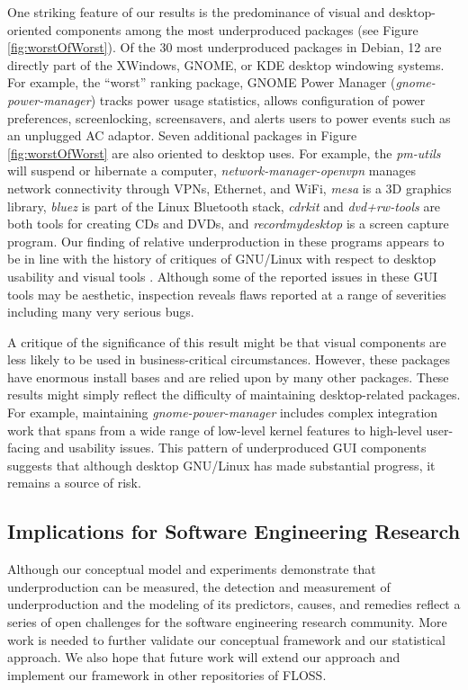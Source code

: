 \documentclass[10pt,conference]{IEEEtran}\usepackage[]{graphicx}\usepackage[usenames,dvipsnames]{color}
\begin{document}
One striking feature of our results is the predominance of visual and desktop-oriented components among the most underproduced packages (see Figure \ref{fig:worstOfWorst}). Of the 30 most underproduced packages in Debian, 12 are directly part of the XWindows, GNOME, or KDE desktop windowing systems. For example, the ``worst'' ranking package, GNOME Power Manager (\textit{gnome-power-manager}) tracks power usage statistics, allows configuration of power preferences, screenlocking, screensavers, and alerts users to power events such as an unplugged AC adaptor. Seven additional packages in Figure \ref{fig:worstOfWorst} are also oriented to desktop uses. For example, the \textit{pm-utils} will suspend or hibernate a computer, \textit{network-manager-openvpn} manages network connectivity through VPNs, Ethernet, and WiFi, \textit{mesa} is a 3D graphics library, \textit{bluez} is part of the Linux Bluetooth stack, \textit{cdrkit} and \textit{dvd+rw-tools} are both tools for creating CDs and DVDs, and \textit{recordmydesktop} is a screen capture program. Our finding of relative underproduction in these programs appears to be in line with the history of critiques of GNU/Linux with respect to desktop usability and visual tools \cite{boldyreff_survey_2009}. 
Although some of the reported issues in these GUI tools may be aesthetic,
inspection reveals flaws reported at a range of severities including many very serious bugs. 

A critique of the significance of this result might be that visual components are less likely to be used in business-critical circumstances. However, these packages have enormous install bases and are relied upon by many other packages.
These results might simply reflect the difficulty of maintaining desktop-related packages. For example, maintaining \textit{gnome-power-manager} includes complex integration work that spans from a wide range of low-level kernel features to high-level user-facing and usability issues. This pattern of underproduced GUI components suggests that although desktop GNU/Linux has made substantial progress, it remains a source of risk.

\subsection{Implications for Software Engineering Research}

Although our conceptual model and experiments demonstrate that underproduction can be measured, the detection and measurement of underproduction and the modeling of its predictors, causes, and remedies reflect a series of open challenges for the software engineering research community.
More work is needed to further validate our conceptual framework and our statistical approach. We also hope that future work will extend our approach and implement our framework in other repositories of FLOSS.
\end{document}

